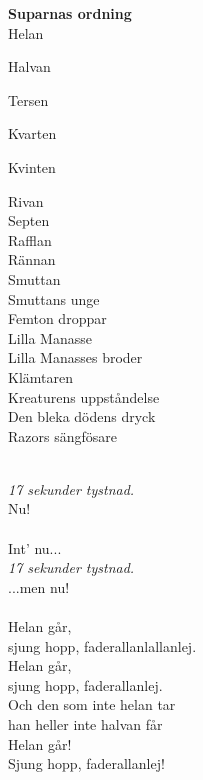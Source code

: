 
\begin{centering}
\Large \textbf{Suparnas ordning}  \\
\vspace{0.5cm}
\small
Helan

Halvan

Tersen

Kvarten

Kvinten

Rivan\\
Septen\\
Rafflan\\
Rännan\\
Smuttan\\
Smuttans unge\\
Femton droppar\\
Lilla Manasse\\
Lilla Manasses broder\\
Klämtaren\\
Kreaturens uppståndelse\\
Den bleka dödens dryck\\
Razors sängfösare\\
\end{centering}
\clearpage
\vspace{0.15cm}
\melo{} \\
\songtext{}\textit{17 sekunder tystnad.}\\
Nu! \\

\vspace{0.15cm}
\melo{} \\
\songtext{}Int' nu... \\ 
\textit{17 sekunder tystnad.}\\
 ...men nu! \\

\vspace{0.15cm}
\melochtext{} \\
\songtext{}Helan går,\\
sjung hopp, faderallanlallanlej.\\
Helan går,\\
sjung hopp, faderallanlej.\\
Och den som inte helan tar\\
han heller inte halvan får\\
Helan går!\\
Sjung hopp, faderallanlej! \\

